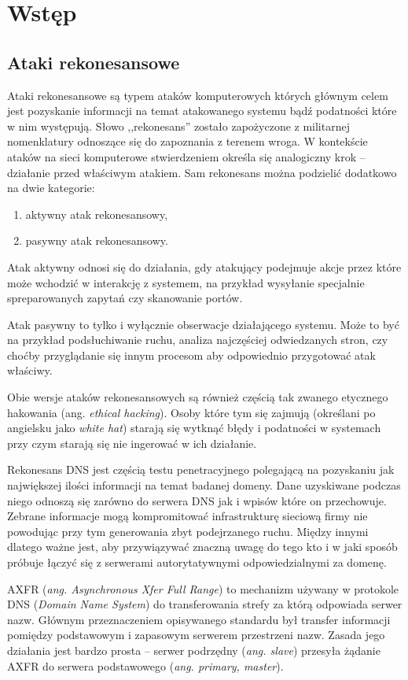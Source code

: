 \chapter{Wstęp}

\section{Ataki rekonesansowe}
Ataki rekonesansowe są typem ataków komputerowych których głównym celem jest pozyskanie informacji na temat atakowanego systemu bądź podatności które w nim występują. Słowo ,,rekonesans'' zostało zapożyczone z militarnej nomenklatury odnoszące się do zapoznania z terenem wroga. W kontekście ataków na sieci komputerowe stwierdzeniem określa się analogiczny krok -- działanie przed właściwym atakiem. Sam rekonesans można podzielić dodatkowo na dwie kategorie:
\begin{enumerate}
	\item aktywny atak rekonesansowy,
	\item pasywny atak rekonesansowy.
\end{enumerate}
Atak aktywny odnosi się do działania, gdy atakujący podejmuje akcje przez które może wchodzić w interakcję z systemem, na przykład wysyłanie specjalnie spreparowanych zapytań czy skanowanie portów.

Atak pasywny to tylko i wyłącznie obserwacje działającego systemu. Może to być na przykład podsłuchiwanie ruchu, analiza najczęściej odwiedzanych stron, czy choćby przyglądanie się innym procesom aby odpowiednio przygotować atak właściwy.

Obie wersje ataków rekonesansowych są również częścią tak zwanego etycznego hakowania (ang. \textit{ethical hacking}). Osoby które tym się zajmują (określani po angielsku jako \textit{white hat}) starają się wytknąć błędy i podatności w systemach przy czym starają się nie ingerować w ich działanie.

Rekonesans DNS jest częścią testu penetracyjnego polegającą na pozyskaniu jak największej ilości informacji na temat badanej domeny. Dane uzyskiwane podczas niego odnoszą się zarówno do serwera DNS jak i wpisów które on przechowuje. Zebrane informacje mogą kompromitować infrastrukturę sieciową firmy nie powodując przy tym generowania zbyt podejrzanego ruchu. Między innymi dlatego ważne jest, aby przywiązywać znaczną uwagę do tego kto i w jaki sposób próbuje łączyć się z serwerami autorytatywnymi odpowiedzialnymi za domenę.


AXFR (\textit{ang. Asynchronous Xfer Full Range}) to mechanizm używany w protokole DNS (\textit{Domain Name System}) do transferowania strefy za którą odpowiada serwer nazw. Głównym przeznaczeniem opisywanego standardu był transfer informacji pomiędzy podstawowym i zapasowym serwerem przestrzeni nazw. Zasada jego działania jest bardzo prosta -- serwer podrzędny (\textit{ang. slave}) przesyła żądanie AXFR do serwera podstawowego (\textit{ang. primary, master}).

